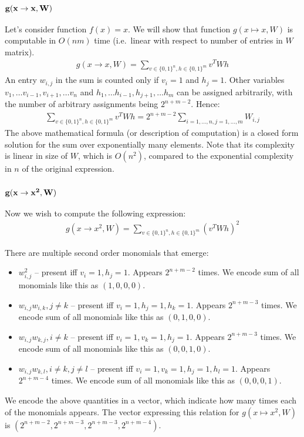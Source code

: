\subsubsection{{$\bf g(x \rightarrow x, W)$}} Let's consider function $f(x) = x$. We
will show that function $g(x \mapsto x, W)$ is computable in $O(nm)$ time
(i.e.~linear with respect to number of entries in $W$ matrix).
\begin{gather*}
	g(x \rightarrow x, W) = \sum_{v \in \{0, 1\}^n, h \in \{0, 1\}^m} v^TWh
\end{gather*}
An entry $w_{i,j}$ in the sum is counted only if $v_i = 1$ and $h_j = 1$. Other variables
$v_1, \dots v_{i-1}, v_{i+1}, \dots v_n$ and $h_1, \dots h_{i-1}, h_{j+1}, \dots h_m$ can be 
assigned arbitrarily, with the number of arbitrary assignments being
$2^{n + m - 2}$. Hence:
\begin{gather*}
	\sum_{v \in \{0, 1\}^n, h \in \{0, 1\}^m} v^TWh = 2^{n + m - 2}\sum_{i = 1, \dots, n, j = 1, \dots, m} W_{i, j}
\end{gather*}
The above mathematical formula (or description of computation) is a
closed form solution for the sum over exponentially many
elements. Note that its complexity is linear in size of $W$, which is
$O(n^2)$, compared to the exponential complexity in $n$ of the
original expression.

\subsubsection{$\bf g(x \rightarrow x^2, W)$}

Now we wish to compute the following expression: 
\begin{gather*}
	g(x \rightarrow x^2, W) = \sum_{v \in \{0, 1\}^n, h \in \{0, 1\}^m} (v^TWh)^2
\end{gather*}

There are multiple second order monomials that emerge: 

\begin{itemize}
	\item $w_{i,j}^2$ -- present iff $v_i = 1, h_j = 1$. Appears $2^{n + m - 2}$ times. We encode sum of all monomials like this as $(1, 0, 0, 0)$.
	\item $w_{i,j} w_{i, k}, j \neq k$ -- present iff $v_i = 1, h_j = 1, h_k = 1$. Appears $2^{n + m - 3}$ times. We encode sum of all monomials like this as $(0, 1, 0, 0)$.	
	\item $w_{i,j} w_{k, j}, i \neq k$ -- present iff $v_i = 1, v_k = 1, h_j = 1$. Appears $2^{n + m - 3}$ times. We encode sum of all monomials like this as $(0, 0, 1, 0)$.
	\item $w_{i,j} w_{k, l}, i \neq k, j \neq l$ -- present iff $v_i = 1, v_k = 1, h_j = 1, h_l = 1$. Appears $2^{n + m - 4}$ times. We encode sum of all monomials like this as $(0, 0, 0, 1)$.
\end{itemize}
We encode the above quantities in a vector, which indicate how many times
each of the monomials 
appears. The vector expressing this relation for $g(x \mapsto x^2, W)$
is $(2^{n + m - 2}, 2^{n + m - 3}, 2^{n + m - 3}, 2^{n + m - 4})$.

